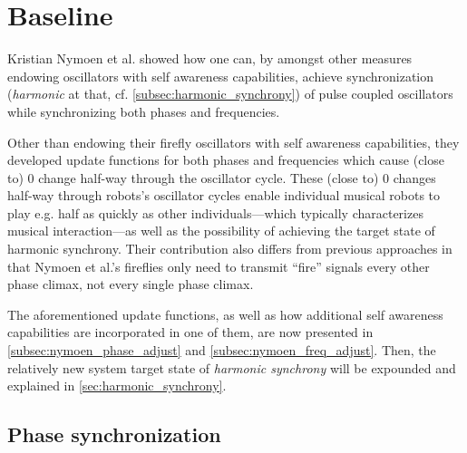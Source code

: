 \chapter{Baseline}
\label{chap:baseline}






Kristian Nymoen et al. \cite{nymoen_synch} showed how one can, by amongst other measures endowing oscillators with self awareness capabilities, achieve synchronization (\textit{harmonic} at that, cf. \ref{subsec:harmonic_synchrony}) of pulse coupled oscillators while synchronizing both phases and frequencies.

Other than endowing their firefly oscillators with self awareness capabilities, they developed update functions for both phases and frequencies which cause (close to) 0 change half-way through the oscillator cycle. These (close to) 0 changes half-way through robots's oscillator cycles enable individual musical robots to play e.g. half as quickly as other individuals—which typically characterizes musical interaction—as well as the possibility of achieving the target state of harmonic synchrony. Their contribution also differs from previous approaches in that Nymoen et al.'s fireflies only need to transmit ``fire'' signals every other phase climax, not every single phase climax. 

The aforementioned update functions, as well as how additional self awareness capabilities are incorporated in one of them, are now presented in \ref{subsec:nymoen_phase_adjust} and \ref{subsec:nymoen_freq_adjust}. Then, the relatively new system target state of \textit{harmonic synchrony} will be expounded and explained in \ref{sec:harmonic_synchrony}.



\section{Phase synchronization} %
\label{sec:nymoen_phase_updates}




